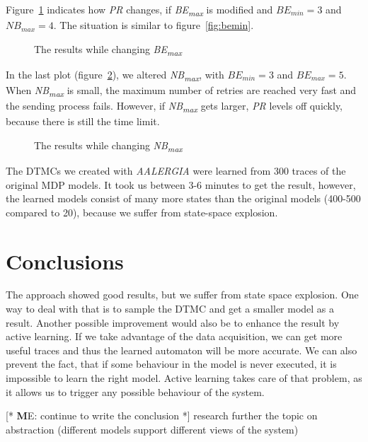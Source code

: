 \documentclass[
a4paper,
12pt
]{scrartcl}
\newcommand\me[1]{ [* {\textbf ME:} #1 *]}
\begin{document}
Figure~\ref{fig:bemax} indicates how \textit{PR} changes, if \textit{BE\textsubscript{max}} is modified and $BE_{min}=3$ and $NB_{max}=4$. The situation is similar to figure~\ref{fig:bemin}.

\begin{figure}[H]
\centering
 \caption{The results while changing \textit{BE\textsubscript{max}}}
    \label{fig:bemax}
\end{figure}

In the last plot (figure~\ref{fig:nbmax}), we altered \textit{NB\textsubscript{max}}, with $BE_{min}=3$ and $BE_{max}=5$. When \textit{NB\textsubscript{max}} is small, the maximum number of retries are reached very fast and the sending process fails. However, if \textit{NB\textsubscript{max}} gets larger, \textit{PR} levels off quickly, because there is still the time limit.

\begin{figure}[H]
\centering
 \caption{The results while changing \textit{NB\textsubscript{max}}}
   \label{fig:nbmax}
\end{figure}

The DTMCs we created with \emph{AALERGIA} were learned from 300 traces of the original MDP models. It took us between 3-6 minutes to get the result, however, the learned  models consist of many more states than the original models (400-500 compared to 20), because we suffer from state-space explosion.

\section{Conclusions}
The approach showed good results, but we suffer from state space explosion. One way to deal with that is to sample the DTMC and get a smaller model as a result. Another possible improvement would also be to enhance the result by active learning. If we take advantage of the data acquisition, we can get more useful traces and thus the learned automaton will be more accurate. We can also prevent the fact, that if some behaviour in the model is never executed, it is impossible to learn the right model. Active learning takes care of that problem, as it allows us to trigger any possible behaviour of the system.

\me{continue to write the conclusion}
research further the topic on abstraction (different models support different views of the system)

\appendix
 
 
\end{document}
